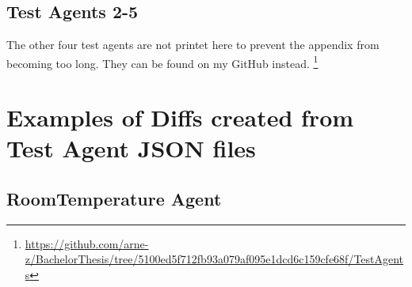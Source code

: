 \section{Test Agents 2-5}
The other four test agents are not printet here to prevent the appendix from becoming too long. They can be found on my GitHub instead.
\footnote{\url{https://github.com/arne-z/BachelorThesis/tree/5100ed5f712fb93a079af095e1dcd6c159cfe68f/TestAgents}}

\chapter{Examples of Diffs created from Test Agent JSON files}

\section{RoomTemperature Agent}
\label{RoomTemperature Agent JSONDiff}

